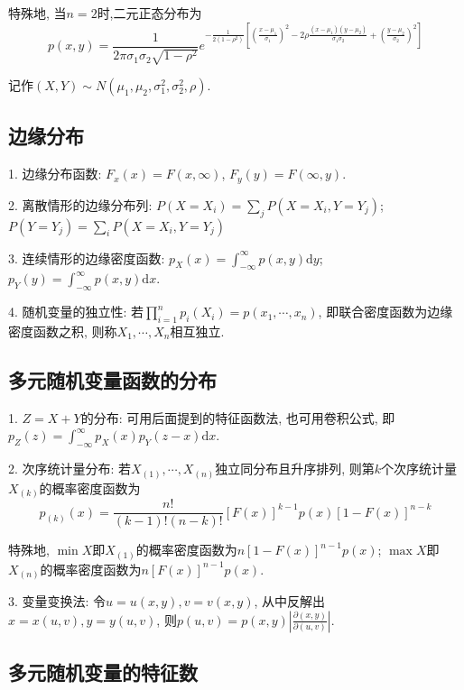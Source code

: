 特殊地, 当$n=2$时,二元正态分布为
\begin{equation*}
    p(x,y)=\frac{1}{2\pi \sigma_1\sigma_2\sqrt{1-\rho^2}}e^{-\frac{1}{2(1-\rho^2)}[(\frac{x-\mu_1}{\sigma_1})^2-2\rho\frac{(x-\mu_1)(y-\mu_2)}{\sigma_1\sigma_2}+(\frac{y-\mu_2}{\sigma_2})^2]}
\end{equation*}

记作$(X,Y)\sim N(\mu_1,\mu_2,\sigma_1^2,\sigma_2^2,\rho)$.

\subsection{边缘分布}

1. 边缘分布函数: $F_x(x)=F(x,\infty)$, $F_y(y)=F(\infty,y)$.

2. 离散情形的边缘分布列: $P(X=X_i)=\sum\limits_j P(X=X_i,Y=Y_j)$; $P(Y=Y_j)=\sum\limits_i P(X=X_i,Y=Y_j)$

3. 连续情形的边缘密度函数: $p_X(x)=\int_{-\infty}^\infty p(x,y) \mathrm{d}y$; $p_Y(y)=\int_{-\infty}^\infty p(x,y) \mathrm{d}x$.

4. 随机变量的独立性: 若$\prod\limits_{i=1}^n p_i(X_i)=p(x_1,\cdots,x_n)$, 即联合密度函数为边缘密度函数之积, 则称$X_1,\cdots, X_n$相互独立.

\subsection{多元随机变量函数的分布}

1. $Z=X+Y$的分布: 可用后面提到的特征函数法, 也可用卷积公式, 即$p_Z(z)=\int_{-\infty}^\infty p_X(x)p_Y(z-x)\mathrm{d}x$.

2. 次序统计量分布: 若$X_{(1)},\cdots,X_{(n)}$独立同分布且升序排列, 则第$k$个次序统计量$X_{(k)}$的概率密度函数为
\begin{equation*}
    p_{(k)}(x)=\frac{n!}{(k-1)!(n-k)!}[F(x)]^{k-1}p(x)[1-F(x)]^{n-k}
\end{equation*}

特殊地, $\min X$即$X_{(1)}$的概率密度函数为$n[1-F(x)]^{n-1}p(x)$; $\max X$即$X_{(n)}$的概率密度函数为$n[F(x)]^{n-1}p(x)$. 

3. 变量变换法: 令$u=u(x,y), v=v(x,y)$, 从中反解出$x=x(u,v), y=y(u,v)$, 则$p(u,v)=p(x,y)\left|\frac{\partial (x,y)}{\partial(u,v)}\right|$.

\subsection{多元随机变量的特征数}

